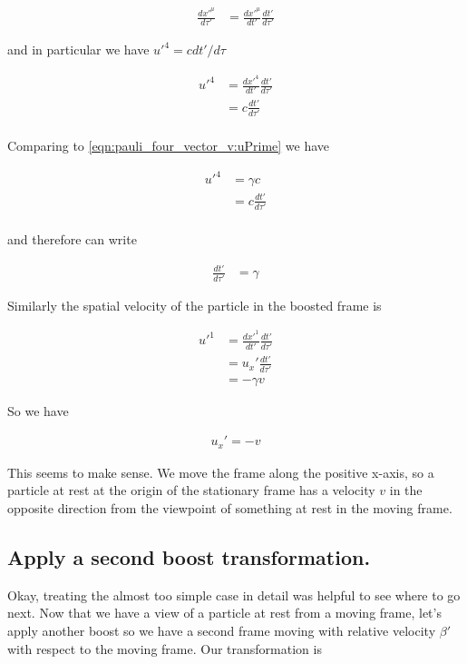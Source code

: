 \begin{align*}
\frac{{dx'}^\mu}{d\tau'}
&=
\frac{{dx'}^\mu}{dt'} \frac{{dt'}}{d\tau'}
\end{align*}

and in particular we have ${u'}^4 = c dt'/d\tau$ %

\begin{align*}
{u'}^4
&=
\frac{{dx'}^4}{dt'} \frac{{dt'}}{d\tau'} \\
&= c \frac{{dt'}}{d\tau'} \\
\end{align*}

Comparing to \ref{eqn:pauli_four_vector_v:uPrime} we have

\begin{align*}
{u'}^4 
&= \gamma c \\
&= c \frac{{dt'}}{d\tau'} \\
\end{align*}

and therefore can write

\begin{align*}
\frac{{dt'}}{d\tau'} 
&= \gamma 
\end{align*}

Similarly the spatial velocity of the particle in the boosted frame is

\begin{align*}
{u'}^1
&=
\frac{{dx'}^1}{dt'} \frac{{dt'}}{d\tau'} \\
&= u_x' \frac{{dt'}}{d\tau'} \\
&= - \gamma v
\end{align*}

So we have 

\begin{align*}
u_x' = -v 
\end{align*}

This seems to make sense.  We move the frame along the positive x-axis, so a particle at rest at the origin of the stationary frame has a velocity $v$ in the opposite direction from the viewpoint of something at rest in the moving frame.

\subsection{Apply a second boost transformation. }

Okay, treating the almost too simple case in detail was helpful to see where to go next.  Now that we have a view of a particle at rest
from a moving frame, let's apply another boost so we have a second frame moving with relative velocity $\beta'$ with respect to the moving
frame.  Our transformation is

